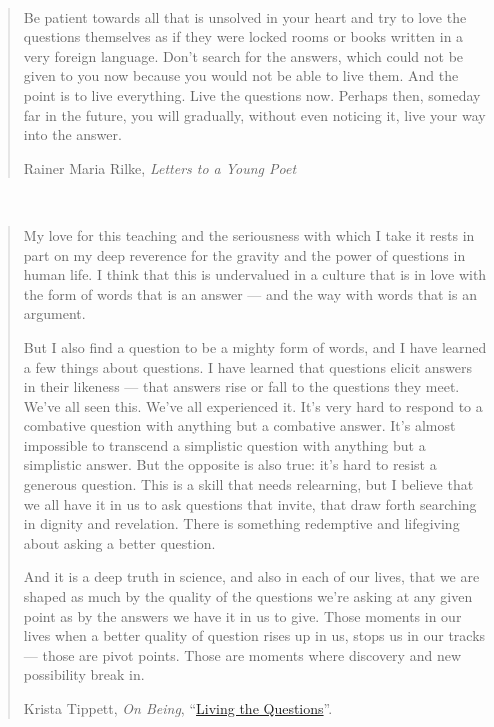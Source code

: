 \documentclass{article}
\begin{document}
  \thispagestyle{empty} ~

  \vfill
  \begin{quote}
    Be patient towards all that is unsolved in your heart and try to love the
    questions themselves as if they were locked rooms or books written in a very
    foreign language. Don't search for the answers, which could not be given to
    you now because you would not be able to live them. And the point is to live
    everything. Live the questions now. Perhaps then, someday far in the future,
    you will gradually, without even noticing it, live your way into the answer.
    \begin{flushright}
      \small{Rainer Maria Rilke, \textit{Letters to a Young Poet}}
    \end{flushright}
  \end{quote}

  ~

  \begin{quote}
  My love for this teaching and the seriousness with which I take it rests in
  part on my deep reverence for the gravity and the power of questions in human
  life. I think that this is undervalued in a culture that is in love with the
  form of words that is an answer — and the way with words that is an argument.

  But I also find a question to be a mighty form of words, and I have learned a
  few things about questions. I have learned that questions elicit answers in
  their likeness — that answers rise or fall to the questions they meet. We've
  all seen this. We've all experienced it. It's very hard to respond to a
  combative question with anything but a combative answer. It's almost
  impossible to transcend a simplistic question with anything but a simplistic
  answer. But the opposite is also true: it's hard to resist a generous
  question. This is a skill that needs relearning, but I believe that we all
  have it in us to ask questions that invite, that draw forth searching in
  dignity and revelation. There is something redemptive and lifegiving about
  asking a better question.

  And it is a deep truth in science, and also in each of our lives, that we are
  shaped as much by the quality of the questions we're asking at any given point
  as by the answers we have it in us to give. Those moments in our lives when a
  better quality of question rises up in us, stops us in our tracks — those are
  pivot points. Those are moments where discovery and new possibility break in.

  \begin{flushright}
  \small{
    Krista Tippett,
    \textit{On Being},
    ``\href{https://onbeing.org/living-the-questions-transcript/}{Living the Questions}''.
  }
  \end{flushright}
  \end{quote}
  \vfill
\end{document}
